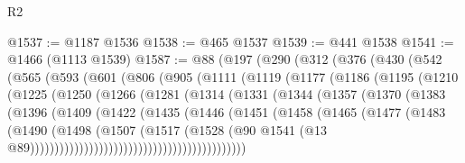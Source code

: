 \begin{lexlean}{R2}
\begin{coremodule}
{{{{{{{{{{{{{{{{{{{{{{{{{{{{{{{{{{{{{{{{{{{{{{{{{{{{{{{{{{{{{{{{{{{{{{{{{{{{{{{{{{{{{{{{{{{{@1537 := @1187 @1536
@1538 := @465 @1537
@1539 := @441 @1538
@1541 := @1466 (@1113 @1539)
@1587 := @88
    (@197
      (@290
        (@312
          (@376
            (@430
              (@542
                (@565
                  (@593
                    (@601
                      (@806
                        (@905
                          (@1111
                            (@1119
                              (@1177
                                (@1186
                                  (@1195
                                    (@1210
                                      (@1225
                                        (@1250
                                          (@1266
                                            (@1281
                                              (@1314
                                                (@1331
                                                  (@1344
                                                    (@1357
                                                      (@1370
                                                        (@1383
                                                          (@1396
                                                            (@1409
                                                              (@1422
                                                                (@1435
                                                                  (@1446
                                                                    (@1451
                                                                      (@1458
                                                                        (@1465
                                                                          (@1477
                                                                            (@1483
                                                                              (@1490
                                                                                (@1498
                                                                                  (@1507
                                                                                    (@1517
                                                                                      (@1528
                                                                                        (@90
                                                                                          @1541
                                                                                          (@13
                                                                                            @89))))))))))))))))))))))))))))))))))))))))))))
}}}}}}}}}}}}}}}}}}}}}}}}}}}}}}}}}}}}}}}}}}}}}}}}}}}}}}}}}}}}}}}}}}}}}}}}}}}}}}}}}}}}}}}}}}}}
\end{coremodule}
\end{lexlean}
